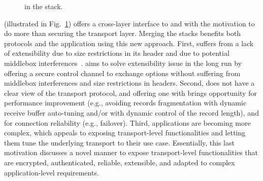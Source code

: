 \begin{figure}[!t]
\begin{center}
\end{center}
\caption{\tcpls in the stack.}
\label{fig:arch}
\end{figure}
\tcpls (illustrated in Fig.~\ref{fig:arch}) offers a cross-layer interface to \tls and \tcp with the motivation to do more than securing the transport layer. Merging the stacks benefits both protocols and the application using this new approach. First, \tcp suffers from a lack of extensibility due to size restrictions in its header and due to potential middlebox interferences~\cite{honda2011still}. \tcpls aims to solve \tcp extensibility issue in the long run by offering a secure control channel to exchange \tcp options without suffering from middlebox interferences and size restrictions in \tcp headers. Second, \tls does not have a clear view of the transport protocol, and offering one with \tcpls brings opportunity for performance improvement (e.g., avoiding records fragmentation with dynamic receive buffer auto-tuning and/or with dynamic control of the record length), and for connection reliability (e.g., failover).  Third, applications are becoming more complex, which appeals to exposing transport-level functionalities and letting them tune the underlying transport to their use case. Essentially, this last motivation discusses a novel manner to expose transport-level functionalities that are encrypted, authenticated, reliable, extensible, and adapted to complex application-level requirements.

